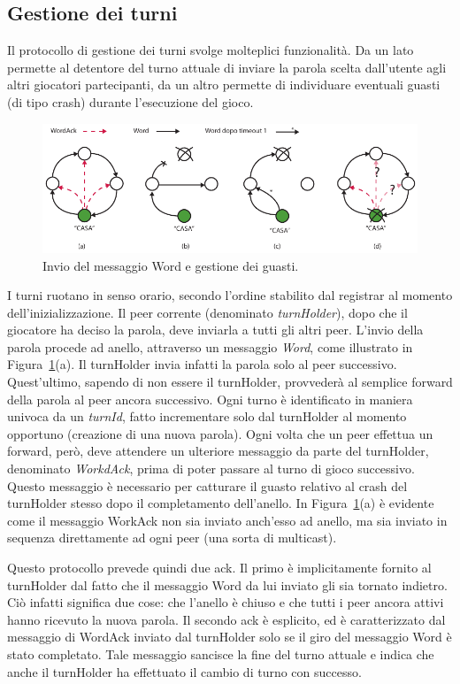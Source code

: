 \documentclass[10.5pt]{article}
\begin{document}
\subsection{Gestione dei turni}

Il protocollo di gestione dei turni svolge molteplici funzionalità. Da un lato permette al detentore del turno attuale di inviare la parola scelta dall'utente agli altri giocatori partecipanti, da un altro permette di individuare eventuali guasti (di tipo crash) durante l'esecuzione del gioco.

\begin{figure}
\centering
\includegraphics[scale=0.9]{imgs/Esempi.pdf}
\caption{Invio del messaggio Word e gestione dei guasti.}
\label{img:word}
\end{figure}

I turni ruotano in senso orario, secondo l'ordine stabilito dal registrar al momento dell'inizializzazione. Il peer corrente (denominato \emph{turnHolder}), dopo che il giocatore ha deciso la parola, deve inviarla a tutti gli altri peer. L'invio della parola procede ad anello, attraverso un messaggio \emph{Word}, come illustrato in Figura~\ref{img:word}(a). Il turnHolder invia infatti la parola solo al peer successivo. Quest'ultimo, sapendo di non essere il turnHolder, provvederà al semplice forward della parola al peer ancora successivo. Ogni turno è identificato in maniera univoca da un \emph{turnId}, fatto incrementare solo dal turnHolder al momento opportuno (creazione di una nuova parola). Ogni volta che un peer effettua un forward, però, deve attendere un ulteriore messaggio da parte del turnHolder, denominato \emph{WorkdAck}, prima di poter passare al turno di gioco successivo. Questo messaggio è necessario per catturare il guasto relativo al crash del turnHolder stesso dopo il completamento dell'anello. In Figura~\ref{img:word}(a) è evidente come il messaggio WorkAck non sia inviato anch'esso ad anello, ma sia inviato in sequenza direttamente ad ogni peer (una sorta di multicast).

Questo protocollo prevede quindi due ack. Il primo è implicitamente fornito al turnHolder dal fatto che il messaggio Word da lui inviato gli sia tornato indietro. Ciò infatti significa due cose: che l'anello è chiuso e che tutti i peer ancora attivi hanno ricevuto la nuova parola. Il secondo ack è esplicito, ed è caratterizzato dal messaggio di WordAck inviato dal turnHolder solo se il giro del messaggio Word è stato completato. Tale messaggio sancisce la fine del turno attuale e indica che anche il turnHolder ha effettuato il cambio di turno con successo.
\end{document}
